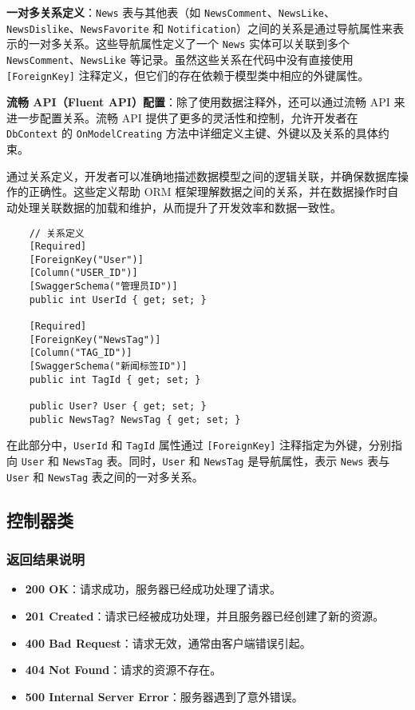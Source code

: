 \textbf{一对多关系定义}：\texttt{News} 表与其他表（如 \texttt{NewsComment}、\texttt{NewsLike}、\texttt{NewsDislike}、\texttt{NewsFavorite} 和 \texttt{Notification}）之间的关系是通过导航属性来表示的一对多关系。这些导航属性定义了一个 \texttt{News} 实体可以关联到多个 \texttt{NewsComment}、\texttt{NewsLike} 等记录。虽然这些关系在代码中没有直接使用 \texttt{[ForeignKey]} 注释定义，但它们的存在依赖于模型类中相应的外键属性。

\textbf{流畅 API（Fluent API）配置}：除了使用数据注释外，还可以通过流畅 API 来进一步配置关系。流畅 API 提供了更多的灵活性和控制，允许开发者在 \texttt{DbContext} 的 \texttt{OnModelCreating} 方法中详细定义主键、外键以及关系的具体约束。


通过关系定义，开发者可以准确地描述数据模型之间的逻辑关联，并确保数据库操作的正确性。这些定义帮助 ORM 框架理解数据之间的关系，并在数据操作时自动处理关联数据的加载和维护，从而提升了开发效率和数据一致性。

\begin{verbatim}
	// 关系定义
	[Required]
	[ForeignKey("User")]
	[Column("USER_ID")]
	[SwaggerSchema("管理员ID")]
	public int UserId { get; set; }
	
	[Required]
	[ForeignKey("NewsTag")]
	[Column("TAG_ID")]
	[SwaggerSchema("新闻标签ID")]
	public int TagId { get; set; }
	
	public User? User { get; set; }
	public NewsTag? NewsTag { get; set; }
\end{verbatim}

在此部分中，\texttt{UserId} 和 \texttt{TagId} 属性通过 \texttt{[ForeignKey]} 注释指定为外键，分别指向 \texttt{User} 和 \texttt{NewsTag} 表。同时，\texttt{User} 和 \texttt{NewsTag} 是导航属性，表示 \texttt{News} 表与 \texttt{User} 和 \texttt{NewsTag} 表之间的一对多关系。

\subsection{控制器类}

\subsubsection{返回结果说明}

\begin{itemize}
	\item \textbf{200 OK}：请求成功，服务器已经成功处理了请求。
	\item \textbf{201 Created}：请求已经被成功处理，并且服务器已经创建了新的资源。
	\item \textbf{400 Bad Request}：请求无效，通常由客户端错误引起。
	\item \textbf{404 Not Found}：请求的资源不存在。
	\item \textbf{500 Internal Server Error}：服务器遇到了意外错误。
\end{itemize}

